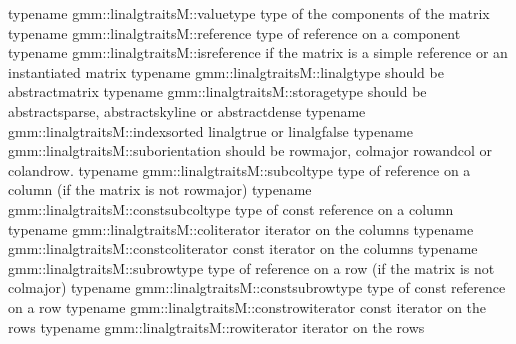 \documentclass[a4paper,11pt,english]{sphinxmanual}
\begin{document}
\begin{sphinxVerbatim}[commandchars=\\\{\}]
typename gmm::linalg\PYGZus{}traits\PYGZlt{}M\PYGZgt{}::value\PYGZus{}type     \PYGZhy{}\PYGZhy{}\PYGZgt{} type of the components of the
                                                   matrix
typename gmm::linalg\PYGZus{}traits\PYGZlt{}M\PYGZgt{}::reference      \PYGZhy{}\PYGZhy{}\PYGZgt{} type of reference on a component
typename gmm::linalg\PYGZus{}traits\PYGZlt{}M\PYGZgt{}::is\PYGZus{}reference   \PYGZhy{}\PYGZhy{}\PYGZgt{} if the matrix is a simple
                                                   reference or an instantiated matrix
typename gmm::linalg\PYGZus{}traits\PYGZlt{}M\PYGZgt{}::linalg\PYGZus{}type    \PYGZhy{}\PYGZhy{}\PYGZgt{} should be abstract\PYGZus{}matrix
typename gmm::linalg\PYGZus{}traits\PYGZlt{}M\PYGZgt{}::storage\PYGZus{}type   \PYGZhy{}\PYGZhy{}\PYGZgt{} should be abstract\PYGZus{}sparse,
                                                   abstract\PYGZus{}skyline or
                                                   abstract\PYGZus{}dense
typename gmm::linalg\PYGZus{}traits\PYGZlt{}M\PYGZgt{}::index\PYGZus{}sorted    \PYGZhy{}\PYGZhy{}\PYGZgt{} linalg\PYGZus{}true or linalg\PYGZus{}false
typename gmm::linalg\PYGZus{}traits\PYGZlt{}M\PYGZgt{}::sub\PYGZus{}orientation \PYGZhy{}\PYGZhy{}\PYGZgt{} should be row\PYGZus{}major, col\PYGZus{}major
                                                    row\PYGZus{}and\PYGZus{}col or col\PYGZus{}and\PYGZus{}row.
typename gmm::linalg\PYGZus{}traits\PYGZlt{}M\PYGZgt{}::sub\PYGZus{}col\PYGZus{}type      \PYGZhy{}\PYGZhy{}\PYGZgt{} type of reference on a column
                                                    (if the matrix is not row\PYGZus{}major)
typename gmm::linalg\PYGZus{}traits\PYGZlt{}M\PYGZgt{}::const\PYGZus{}sub\PYGZus{}col\PYGZus{}type \PYGZhy{}\PYGZhy{}\PYGZgt{} type of const reference on a
                                                     column
typename gmm::linalg\PYGZus{}traits\PYGZlt{}M\PYGZgt{}::col\PYGZus{}iterator      \PYGZhy{}\PYGZhy{}\PYGZgt{} iterator on the columns
typename gmm::linalg\PYGZus{}traits\PYGZlt{}M\PYGZgt{}::const\PYGZus{}col\PYGZus{}iterator \PYGZhy{}\PYGZhy{}\PYGZgt{} const iterator on the columns
typename gmm::linalg\PYGZus{}traits\PYGZlt{}M\PYGZgt{}::sub\PYGZus{}row\PYGZus{}type      \PYGZhy{}\PYGZhy{}\PYGZgt{} type of reference on a row
                                                    (if the matrix is not col\PYGZus{}major)
typename gmm::linalg\PYGZus{}traits\PYGZlt{}M\PYGZgt{}::const\PYGZus{}sub\PYGZus{}row\PYGZus{}type \PYGZhy{}\PYGZhy{}\PYGZgt{} type of const reference on a
                                                     row
typename gmm::linalg\PYGZus{}traits\PYGZlt{}M\PYGZgt{}::const\PYGZus{}row\PYGZus{}iterator \PYGZhy{}\PYGZhy{}\PYGZgt{} const iterator on the rows
typename gmm::linalg\PYGZus{}traits\PYGZlt{}M\PYGZgt{}::row\PYGZus{}iterator       \PYGZhy{}\PYGZhy{}\PYGZgt{} iterator on the rows


\end{sphinxVerbatim}
\end{document}
